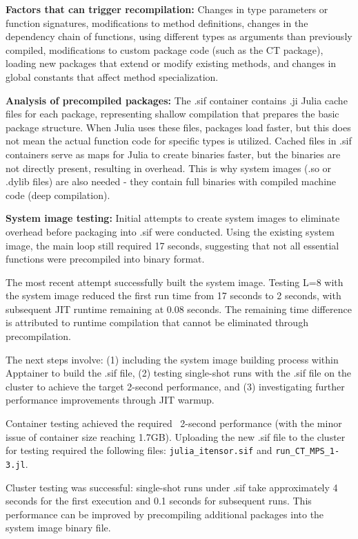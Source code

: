 \documentclass[11pt,a4paper]{article}
\begin{document}
\textbf{Factors that can trigger recompilation:}
Changes in type parameters or function signatures, modifications to method definitions, changes in the dependency chain of functions, using different types as arguments than previously compiled, modifications to custom package code (such as the CT package), loading new packages that extend or modify existing methods, and changes in global constants that affect method specialization.

\textbf{Analysis of precompiled packages:}
The .sif container contains .ji Julia cache files for each package, representing shallow compilation that prepares the basic package structure. When Julia uses these files, packages load faster, but this does not mean the actual function code for specific types is utilized. Cached files in .sif containers serve as maps for Julia to create binaries faster, but the binaries are not directly present, resulting in overhead. This is why system images (.so or .dylib files) are also needed - they contain full binaries with compiled machine code (deep compilation).

\textbf{System image testing:}
Initial attempts to create system images to eliminate overhead before packaging into .sif were conducted. Using the existing system image, the main loop still required 17 seconds, suggesting that not all essential functions were precompiled into binary format.

The most recent attempt successfully built the system image. Testing L=8 with the system image reduced the first run time from 17 seconds to 2 seconds, with subsequent JIT runtime remaining at 0.08 seconds. The remaining time difference is attributed to runtime compilation that cannot be eliminated through precompilation.

The next steps involve: (1) including the system image building process within Apptainer to build the .sif file, (2) testing single-shot runs with the .sif file on the cluster to achieve the target 2-second performance, and (3) investigating further performance improvements through JIT warmup.

Container testing achieved the required ~2-second performance (with the minor issue of container size reaching 1.7GB). Uploading the new .sif file to the cluster for testing required the following files: \texttt{julia\_itensor.sif} and \texttt{run\_CT\_MPS\_1-3.jl}.

Cluster testing was successful: single-shot runs under .sif take approximately 4 seconds for the first execution and 0.1 seconds for subsequent runs. This performance can be improved by precompiling additional packages into the system image binary file.
\end{document}
